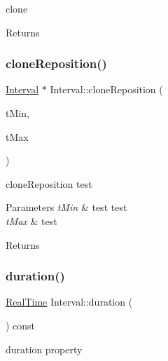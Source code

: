clone 

\begin{DoxyReturn}{Returns}

\end{DoxyReturn}
\mbox{\label{class_interval_afa26f985839fcb819f9fec30fc22afb8}} 
\subsubsection{\texorpdfstring{clone\+Reposition()}{cloneReposition()}}
{\footnotesize\ttfamily \hyperlink{class_interval}{Interval} $\ast$ Interval\+::clone\+Reposition (\begin{DoxyParamCaption}\item[{const \hyperlink{struct_real_time}{Real\+Time}}]{t\+Min,  }\item[{const \hyperlink{struct_real_time}{Real\+Time}}]{t\+Max }\end{DoxyParamCaption})}



clone\+Reposition test 


\begin{DoxyParams}{Parameters}
{\em t\+Min} & test test \\
\hline
{\em t\+Max} & test \\
\hline
\end{DoxyParams}
\begin{DoxyReturn}{Returns}

\end{DoxyReturn}
\mbox{\label{class_interval_a1b35d8374a045798f2cdc19d365855de}} 
\subsubsection{\texorpdfstring{duration()}{duration()}}
{\footnotesize\ttfamily \hyperlink{struct_real_time}{Real\+Time} Interval\+::duration (\begin{DoxyParamCaption}{ }\end{DoxyParamCaption}) const\hspace{0.3cm}{\ttfamily [inline]}}



duration property 

